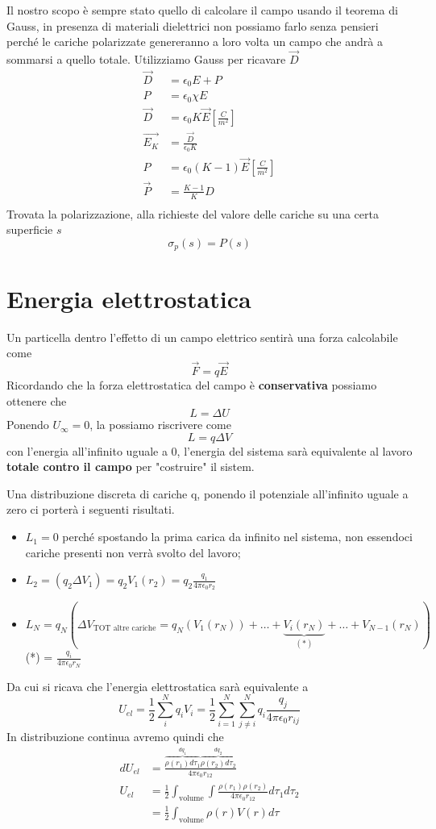 \documentclass[a4paper, 12pt]{book}
\theoremstyle{plain}
\begin{document}
Il nostro scopo è sempre stato quello di calcolare il campo usando il teorema di Gauss, in presenza di materiali dielettrici non
 possiamo farlo senza pensieri perché le cariche polarizzate genereranno a loro volta un campo che andrà a sommarsi a quello totale.
 Utilizziamo Gauss per ricavare $\vec{D}$
\[
    \begin{split}
        \vec{D} &= \epsilon_0 E + P \\
        P &= \epsilon_0 \chi E \\
        \vec{D} &= \epsilon_0 K \vec{E} [\frac{C}{m^2}]\\
        \vec{E_K} &= \frac{\vec{D}}{\epsilon_0 K} \\
        P &= \epsilon_0 (K - 1) \vec{E} [\frac{C}{m^2}] \\
        \vec{P} &= \frac{K - 1}{K} D \\
    \end{split}
\] 
Trovata la polarizzazione, alla richieste del valore delle cariche su una certa superficie $s$
\[
    \sigma_p (s) = P (s)
\]

\chapter{Energia elettrostatica}

Un particella dentro l'effetto di un campo elettrico 
sentirà una forza calcolabile come \[ \vec{F} = q\vec{E} \] 
Ricordando che la forza elettrostatica del campo è 
\textbf{conservativa} possiamo ottenere che \[ L = \Delta U \] 
Ponendo $U_\infty = 0$, la possiamo riscrivere come \[ L 
= q\Delta V \] con l'energia all'infinito uguale a 0, 
l'energia del sistema sarà equivalente al lavoro \textbf{totale
contro il campo} per "costruire" il sistem.

Una distribuzione discreta di cariche q, ponendo il potenziale 
all'infinito uguale a zero ci porterà i seguenti risultati.
\begin{itemize}
    \item $L_1 = 0$ perché spostando la prima carica da 
    infinito nel sistema, non essendoci cariche presenti
    non verrà svolto del lavoro;
    \item $L_2 = (q_2 \Delta V_1) = q_2 V_1(r_2) = q_2 \frac{q_1}{4 \pi \epsilon_0 r_2}$
    \item $L_N = q_N (\Delta V_{\textrm{TOT altre cariche}} = 
    q_N (V_1(r_N)) + \dots + \underbrace{V_i(r_N)}_{(*)} + \dots + V_{N-1} (r_N))$ (*) = $\frac{q_i}{4 \pi \epsilon_0 r_N}$
\end{itemize}
Da cui si ricava che l'energia elettrostatica sarà 
equivalente a \[ U_{el} = \frac{1}{2} \sum_i^N q_i V_i = 
\frac{1}{2} \sum_{i=1}^N \sum_{j\neq i}^N q_i \frac{q_j}{4 \pi \epsilon_0 r_{ij}} \]
In distribuzione continua avremo quindi che 
\[ \begin{split}
    dU_{el} &= \frac{\overbrace{\rho(r_1)d\tau_1}^{dq_1}\overbrace{\rho(r_2)d\tau_2}^{dq_2}}{4\pi \epsilon_0 r_{12}} \\
    U_{el} &= \frac{1}{2} \int_{\textrm{volume}}\int \frac{\rho(r_1)\rho(r_2)}{4 \pi \epsilon_0 r_{12}}d\tau_1d\tau_2 \\
    &= \frac{1}{2} \int_{\textrm{volume}} \rho (r) V(r) d \tau 
\end{split}
\]
\end{document}
